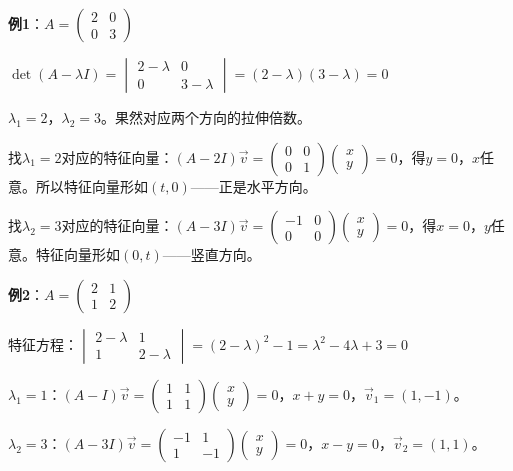 \documentclass[a4paper,12pt]{ctexart}
\begin{document}
\textbf{例1}：$A=\begin{pmatrix}2&0\\0&3\end{pmatrix}$

$\det(A-\lambda I)=\begin{vmatrix}2-\lambda&0\\0&3-\lambda\end{vmatrix}=(2-\lambda)(3-\lambda)=0$

$\lambda_1=2$，$\lambda_2=3$。果然对应两个方向的拉伸倍数。

找$\lambda_1=2$对应的特征向量：$(A-2I)\vec v=\begin{pmatrix}0&0\\0&1\end{pmatrix}\begin{pmatrix}x\\y\end{pmatrix}=0$，得$y=0$，$x$任意。所以特征向量形如$(t,0)$——正是水平方向。

找$\lambda_2=3$对应的特征向量：$(A-3I)\vec v=\begin{pmatrix}-1&0\\0&0\end{pmatrix}\begin{pmatrix}x\\y\end{pmatrix}=0$，得$x=0$，$y$任意。特征向量形如$(0,t)$——竖直方向。

\textbf{例2}：$A=\begin{pmatrix}2&1\\1&2\end{pmatrix}$

特征方程：$\begin{vmatrix}2-\lambda&1\\1&2-\lambda\end{vmatrix}=(2-\lambda)^2-1=\lambda^2-4\lambda+3=0$

$\lambda_1=1$：$(A-I)\vec v=\begin{pmatrix}1&1\\1&1\end{pmatrix}\begin{pmatrix}x\\y\end{pmatrix}=0$，$x+y=0$，$\vec v_1=(1,-1)$。

$\lambda_2=3$：$(A-3I)\vec v=\begin{pmatrix}-1&1\\1&-1\end{pmatrix}\begin{pmatrix}x\\y\end{pmatrix}=0$，$x-y=0$，$\vec v_2=(1,1)$。
\end{document}
